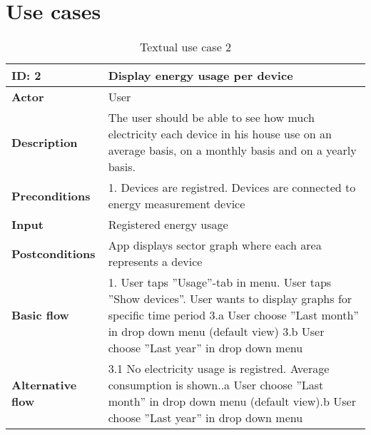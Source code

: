 \chapter{Use cases}

\begin{table}[H]
\begin{tabular}{|l|p{11.7cm}|}
\hline
\textbf{ID: }2&\textbf{Display energy usage per device}\\\hline
\textbf{Actor} &User\\\hline
\textbf{Description}&
The user should be able to see how much electricity each device in his house use on an average basis, on a monthly basis and on a yearly basis.\\\hline
\textbf{Preconditions}&
1. Devices are registred\newline
2. Devices are connected to energy measurement device\\\hline
\textbf{Input}&
Registered energy usage\\\hline
\textbf{Postconditions}& App displays sector graph where each area represents a device\\\hline
\textbf{Basic flow}&
1. User taps ''Usage''-tab in menu\newline
2. User taps ''Show devices''\newline
3. User wants to display graphs for specific time period\newline
3.a User choose ''Last month'' in drop down menu (default view)\newline
3.b User choose ''Last year'' in drop down menu\\\hline
\textbf{Alternative flow}&
3.1 No electricity usage is registred. Average consumption is shown.\newline
3.1.a User choose ''Last month'' in drop down menu (default view)\newline
3.1.b User choose ''Last year'' in drop down menu\\\hline
\end{tabular}
\caption{Textual use case 2}
\end{table}


